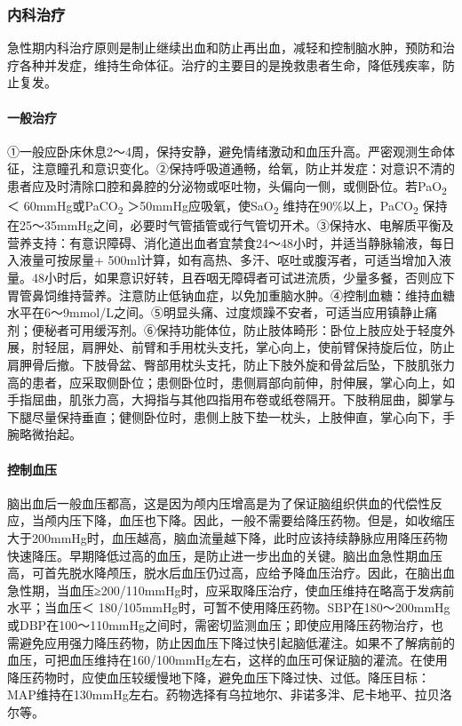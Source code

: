 \subsubsection{内科治疗}

急性期内科治疗原则是制止继续出血和防止再出血，减轻和控制脑水肿，预防和治疗各种并发症，维持生命体征。治疗的主要目的是挽救患者生命，降低残疾率，防止复发。

\paragraph{一般治疗}

①一般应卧床休息2～4周，保持安静，避免情绪激动和血压升高。严密观测生命体征，注意瞳孔和意识变化。②保持呼吸道通畅，给氧，防止并发症：对意识不清的患者应及时清除口腔和鼻腔的分泌物或呕吐物，头偏向一侧，或侧卧位。若PaO\textsubscript{2}
＜ 60mmHg或PaCO\textsubscript{2} ＞50mmHg应吸氧，使SaO\textsubscript{2}
维持在90\%以上，PaCO\textsubscript{2}
保持在25～35mmHg之间，必要时气管插管或行气管切开术。③保持水、电解质平衡及营养支持：有意识障碍、消化道出血者宜禁食24～48小时，并适当静脉输液，每日入液量可按尿量+
500ml计算，如有高热、多汗、呕吐或腹泻者，可适当增加入液量。48小时后，如果意识好转，且吞咽无障碍者可试进流质，少量多餐，否则应下胃管鼻饲维持营养。注意防止低钠血症，以免加重脑水肿。④控制血糖：维持血糖水平在6～9mmol/L之间。⑤明显头痛、过度烦躁不安者，可适当应用镇静止痛剂；便秘者可用缓泻剂。⑥保持功能体位，防止肢体畸形：卧位上肢应处于轻度外展，肘轻屈，肩胛处、前臂和手用枕头支托，掌心向上，使前臂保持旋后位，防止肩胛骨后撤。下肢骨盆、臀部用枕头支托，防止下肢外旋和骨盆后坠，下肢肌张力高的患者，应采取侧卧位；患侧卧位时，患侧肩部向前伸，肘伸展，掌心向上，如手指屈曲，肌张力高，大拇指与其他四指用布卷或纸卷隔开。下肢稍屈曲，脚掌与下腿尽量保持垂直；健侧卧位时，患侧上肢下垫一枕头，上肢伸直，掌心向下，手腕略微抬起。

\paragraph{控制血压}

脑出血后一般血压都高，这是因为颅内压增高是为了保证脑组织供血的代偿性反应，当颅内压下降，血压也下降。因此，一般不需要给降压药物。但是，如收缩压大于200mmHg时，血压越高，脑血流量越下降，此时应该持续静脉应用降压药物快速降压。早期降低过高的血压，是防止进一步出血的关键。脑出血急性期血压高，可首先脱水降颅压，脱水后血压仍过高，应给予降血压治疗。因此，在脑出血急性期，当血压≥200/110mmHg时，应采取降压治疗，使血压维持在略高于发病前水平；当血压＜
180/105mmHg时，可暂不使用降压药物。SBP在180～200mmHg或DBP在100～110mmHg之间时，需密切监测血压；即使应用降压药物治疗，也需避免应用强力降压药物，防止因血压下降过快引起脑低灌注。如果不了解病前的血压，可把血压维持在160/100mmHg左右，这样的血压可保证脑的灌流。在使用降压药物时，应使血压较缓慢地下降，避免血压下降过快、过低。降压目标：MAP维持在130mmHg左右。药物选择有乌拉地尔、非诺多泮、尼卡地平、拉贝洛尔等。

